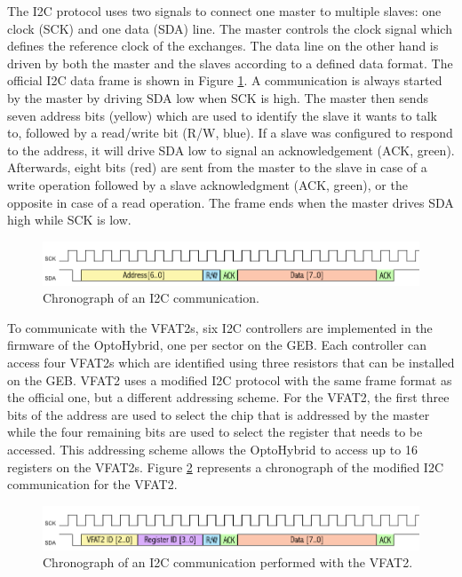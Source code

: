       The I2C protocol uses two signals to connect one master to multiple slaves: one clock (SCK) and one data (SDA) line. The master controls the clock signal which defines the reference clock of the exchanges. The data line on the other hand is driven by both the master and the slaves according to a defined data format. The official I2C data frame is shown in Figure \ref{fig:II-3-i2c}. A communication is always started by the master by driving SDA low when SCK is high. The master then sends seven address bits (yellow) which are used to identify the slave it wants to talk to, followed by a read/write bit (R/W, blue). If a slave was configured to respond to the address, it will drive SDA low to signal an acknowledgement (ACK, green). Afterwards, eight bits (red) are sent from the master to the slave in case of a write operation followed by a slave acknowledgment (ACK, green), or the opposite in case of a read operation. The frame ends when the master drives SDA high while SCK is low. \\

      \begin{figure}[h!]
        \centering
        \includegraphics[width=\textwidth]{img/II-3-test-beam/i2c.png}
        \caption{Chronograph of an I2C communication.}
        \label{fig:II-3-i2c}
      \end{figure}

      To communicate with the VFAT2s, six I2C controllers are implemented in the firmware of the OptoHybrid, one per sector on the GEB. Each controller can access four VFAT2s which are identified using three resistors that can be installed on the GEB. VFAT2 uses a modified I2C protocol with the same frame format as the official one, but a different addressing scheme. For the VFAT2, the first three bits of the address are used to select the chip that is addressed by the master while the four remaining bits are used to select the register that needs to be accessed. This addressing scheme allows the OptoHybrid to access up to 16 registers on the VFAT2s. Figure \ref{fig:II-3-i2c-vfat2} represents a chronograph of the modified I2C communication for the VFAT2. \\

      \begin{figure}[h!]
        \centering
        \includegraphics[width=\textwidth]{img/II-3-test-beam/i2c-vfat2.png}
        \caption{Chronograph of an I2C communication performed with the VFAT2.}
        \label{fig:II-3-i2c-vfat2}
      \end{figure}

